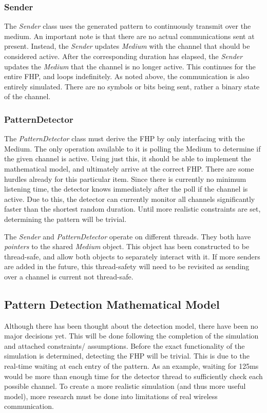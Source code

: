 \documentclass[conference]{IEEEtran}
\begin{document}
\subsubsection{Sender}
The \textit{Sender} class uses the generated pattern to continuously transmit over the medium.
An important note is that there are no actual communications sent at present.
Instead, the \textit{Sender} updates \textit{Medium} with the channel that should be considered active.
After the corresponding duration has elapsed, the \textit{Sender} updates the \textit{Medium} that the channel is no longer active.
This continues for the entire FHP, and loops indefinitely.
As noted above, the communication is also entirely simulated.
There are no symbols or bits being sent, rather a binary state of the channel.

\subsubsection{PatternDetector}
The \textit{PatternDetector} class must derive the FHP by only interfacing with the Medium.
The only operation available to it is polling the Medium to determine if the given channel is active.
Using just this, it should be able to implement the mathematical model, and ultimately arrive at the correct FHP.
There are some hurdles already for this particular item.
Since there is currently no minimum listening time, the detector knows immediately after the poll if the channel is active.
Due to this, the detector can currently monitor all channels significantly faster than the shortest random duration.
Until more realistic constraints are set, determining the pattern will be trivial.

The \textit{Sender} and \textit{PatternDetector} operate on different threads.
They both have \textit{pointers} to the shared \textit{Medium} object.
This object has been constructed to be thread-safe, and allow both objects to separately interact with it.
If more senders are added in the future, this thread-safety will need to be revisited as sending over a channel is current not thread-safe.

\subsection{Pattern Detection Mathematical Model}
Although there has been thought about the detection model, there have been no major decisions yet.
This will be done following the completion of the simulation and attached constraints/ assumptions.
Before the exact functionality of the simulation is determined, detecting the FHP will be trivial.
This is due to the real-time waiting at each entry of the pattern.
As an example, waiting for 125ms would be more than enough time for the detector thread to sufficiently check each possible channel.
To create a more realistic simulation (and thus more useful model), more research must be done into limitations of real wireless communication.
\end{document}
